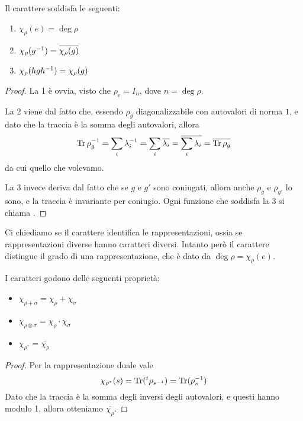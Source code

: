 \documentclass[a4paper,10pt,oneside]{math_article}
\newcommand{\id}{I}
\let\conj\overline
\begin{document}
    \begin{myprop}
      Il carattere soddisfa le seguenti:
      \begin{enumerate}
       \item $\chi_\rho(e)=\deg\rho$
       \item $\chi_\rho(g\inv)=\conj{\chi_\rho(g)}$
       \item $\chi_\rho(hgh^{-1})=\chi_\rho(g)$
      \end{enumerate}

    \end{myprop}
    \begin{proof}
     La 1 è ovvia, visto che $\rho_e= \id_n$, dove $n=\deg \rho$.
     
     La 2 viene dal fatto che, essendo $\rho_g$ diagonalizzabile con autovalori di norma $1$, e dato che la traccia è la somma degli autovalori, allora
     \[
      \Tr\rho_g\inv = \sum_i \lambda_i\inv = \sum_i \conj{\lambda_i} = \conj{\sum_i \lambda_i} = \conj{\Tr\rho_g} 
     \]
     da cui quello che volevamo.
     
     La 3 invece deriva dal fatto che se $g$ e $g'$ sono coniugati, allora anche $\rho_g$ e $\rho_{g'}$ lo sono, e la traccia è invariante per coniugio. Ogni funzione che soddisfa la 3 si chiama .
    \end{proof}
    
    Ci chiediamo se il carattere identifica le rappresentazioni, ossia se rappresentazioni diverse hanno caratteri diversi.
    Intanto però il carattere distingue il grado di una rappresentazione, che è dato da $\deg \rho = \chi_\rho(e)$.
 
    \begin{mylemma}
    I caratteri godono delle seguenti proprietà:
      \begin{itemize}
      \item $\chi_{\rho+\sigma}=\chi_\rho+\chi_\sigma$     
      \item $\chi_{\rho\otimes\sigma}=\chi_\rho\cdot\chi_\sigma$
      \item $\chi_{\rho^*} = \conj{\chi_\rho}$
      \end{itemize}
    \end{mylemma}
    \begin{proof}
     Per la rappresentazione duale vale 
     \[
      \chi_{\rho^*}(s)=\operatorname{Tr} (\prescript{t}{}{\rho}_{s^{-1}})=\operatorname{Tr} (\rho_s^{-1})
     \]
     Dato che la traccia è la somma degli inversi degli autovalori, e questi hanno modulo 1, allora otteniamo $\conj{\chi_\rho}$. 

    \end{proof}
\end{document}
